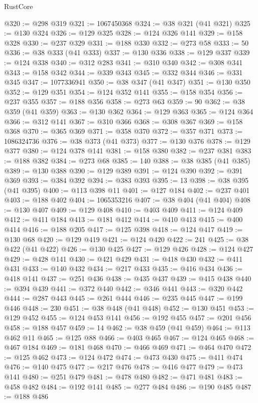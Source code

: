 \begin{lexlean}{RustCore}
\begin{coremodule}
@320 := @298 @319
@321 := 1067450368
@324 := @38 @321 (@41 @321)
@325 := @130 @324
@326 := @129 @325
@328 := @124 @326 @141
@329 := @158 @328
@330 := @237 @329
@331 := @188 @330
@332 := @273 @58
@333 := 50
@336 := @38 @333 (@41 @333)
@337 := @130 @336
@338 := @129 @337
@339 := @124 @338
@340 := @312 @283
@341 := @310 @340
@342 := @308 @341
@343 := @158 @342
@344 := @339 @343
@345 := @332 @344
@346 := @331 @345
@347 := 1077336941
@350 := @38 @347 (@41 @347)
@351 := @130 @350
@352 := @129 @351
@354 := @124 @352 @141
@355 := @158 @354
@356 := @237 @355
@357 := @188 @356
@358 := @273 @63
@359 := 90
@362 := @38 @359 (@41 @359)
@363 := @130 @362
@364 := @129 @363
@365 := @124 @364
@366 := @312 @141
@367 := @310 @366
@368 := @308 @367
@369 := @158 @368
@370 := @365 @369
@371 := @358 @370
@372 := @357 @371
@373 := 1086324736
@376 := @38 @373 (@41 @373)
@377 := @130 @376
@378 := @129 @377
@380 := @124 @378 @141
@381 := @158 @380
@382 := @237 @381
@383 := @188 @382
@384 := @273 @68
@385 := 140
@388 := @38 @385 (@41 @385)
@389 := @130 @388
@390 := @129 @389
@391 := @124 @390
@392 := @391 @369
@393 := @384 @392
@394 := @383 @393
@395 := 13
@398 := @38 @395 (@41 @395)
@400 := @113 @398 @11
@401 := @127 @184
@402 := @237 @401
@403 := @188 @402
@404 := 1065353216
@407 := @38 @404 (@41 @404)
@408 := @130 @407
@409 := @129 @408
@410 := @403 @409
@411 := @124 @409
@412 := @411 @184
@413 := @181 @412
@414 := @410 @413
@415 := @400 @414
@416 := @188 @205
@417 := @125 @398
@418 := @124 @417
@419 := @130 @68
@420 := @129 @419
@421 := @124 @420
@422 := 241
@425 := @38 @422 (@41 @422)
@426 := @130 @425
@427 := @129 @426
@428 := @124 @427
@429 := @428 @141
@430 := @421 @429
@431 := @418 @430
@432 := @411 @431
@433 := @140 @432
@434 := @217 @433
@435 := @416 @434
@436 := @418 @141
@437 := @251 @436
@438 := @435 @437
@439 := @415 @438
@440 := @394 @439
@441 := @372 @440
@442 := @346 @441
@443 := @320 @442
@444 := @287 @443
@445 := @261 @444
@446 := @235 @445
@447 := @199 @446
@448 := 230
@451 := @38 @448 (@41 @448)
@452 := @130 @451
@453 := @129 @452
@455 := @124 @453 @141
@456 := @192 @455
@457 := @201 @456
@458 := @188 @457
@459 := 14
@462 := @38 @459 (@41 @459)
@464 := @113 @462 @11
@465 := @125 @88
@466 := @403 @465
@467 := @124 @465
@468 := @467 @184
@469 := @181 @468
@470 := @466 @469
@471 := @464 @470
@472 := @125 @462
@473 := @124 @472
@474 := @473 @430
@475 := @411 @474
@476 := @140 @475
@477 := @217 @476
@478 := @416 @477
@479 := @473 @141
@480 := @251 @479
@481 := @478 @480
@482 := @471 @481
@483 := @458 @482
@484 := @192 @141
@485 := @277 @484
@486 := @190 @485
@487 := @188 @486

\end{coremodule}
\end{lexlean}
